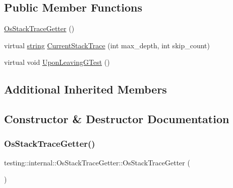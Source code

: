 \subsection*{Public Member Functions}
\begin{DoxyCompactItemize}
\item 
\hyperlink{classtesting_1_1internal_1_1_os_stack_trace_getter_aa40b3120c0ae4ec640de8b577ab7da17}{Os\+Stack\+Trace\+Getter} ()
\item 
virtual \hyperlink{namespacetesting_1_1internal_a8e8ff5b11e64078831112677156cb111}{string} \hyperlink{classtesting_1_1internal_1_1_os_stack_trace_getter_ad85d7766a222befa3e7f3c6932046ac2}{Current\+Stack\+Trace} (int max\+\_\+depth, int skip\+\_\+count)
\item 
virtual void \hyperlink{classtesting_1_1internal_1_1_os_stack_trace_getter_a8ae0237629b6b5672b4b5ef8e292205c}{Upon\+Leaving\+G\+Test} ()
\end{DoxyCompactItemize}
\subsection*{Additional Inherited Members}


\subsection{Constructor \& Destructor Documentation}
\mbox{\label{classtesting_1_1internal_1_1_os_stack_trace_getter_aa40b3120c0ae4ec640de8b577ab7da17}} 
\subsubsection{\texorpdfstring{Os\+Stack\+Trace\+Getter()}{OsStackTraceGetter()}}
{\footnotesize\ttfamily testing\+::internal\+::\+Os\+Stack\+Trace\+Getter\+::\+Os\+Stack\+Trace\+Getter (\begin{DoxyParamCaption}{ }\end{DoxyParamCaption})\hspace{0.3cm}{\ttfamily [inline]}}



